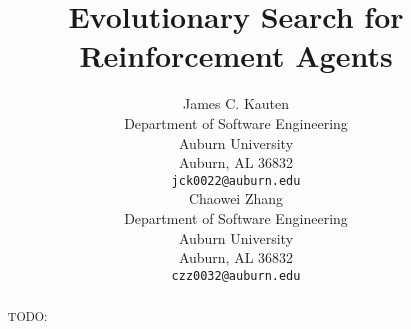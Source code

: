 \title{Evolutionary Search for Reinforcement Agents}

\author{
	James C. Kauten \\
	Department of Software Engineering \\
	Auburn University \\
	Auburn, AL 36832 \\
	\texttt{jck0022@auburn.edu} \\
	\And
	Chaowei Zhang \\
	Department of Software Engineering \\
	Auburn University \\
	Auburn, AL 36832 \\
	\texttt{czz0032@auburn.edu} \\
}

\maketitle

\begin{abstract}
TODO:
\end{abstract}
